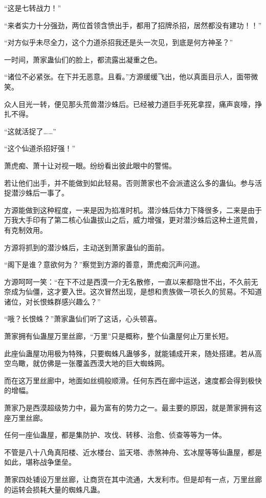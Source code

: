 \begin{this_body}
“这是七转战力！”

“来者实力十分强劲，两位首领含愤出手，都用了招牌杀招，居然都没有建功！！”

“对方似乎未尽全力，这个力道杀招我还是头一次见，到底是何方神圣？”

一时间，萧家蛊仙们的脸上，都流露出凝重之色。

“诸位不必紧张。在下并无恶意。且看。”方源缓缓飞出，他以真面目示人，面带微笑。

众人目光一转，便见那头荒兽潜沙蛛后。已经被力道巨手死死拿捏，痛声哀嚎，挣扎不得。

“这就活捉了……”

“这个仙道杀招好强！”

萧虎痴、萧十让对视一眼。纷纷看出彼此眼中的警惕。

若让他们出手，并不能做到如此轻易。否则萧家也不会派遣这么多的蛊仙。参与活捉潜沙蛛后一事了。

方源能做到这种程度，一来是因为掐准时机。潜沙蛛后体力下降很多，二来是由于万我大手印有了第二核心仙蛊拔山之后，威力增强，更对潜沙蛛后这种土道荒兽，有克制效用。

方源将抓到的潜沙蛛后，主动送到萧家蛊仙的面前。

“阁下是谁？意欲何为？”察觉到方源的善意，萧虎痴沉声问道。

方源呵呵一笑：“在下不过是西漠一介无名散修，一直以来都隐世不出，不久前无奈成为仙僵，这才要入世。这次冒然出现，是想和贵族做一项长久的贸易。不知道诸位，对长恨蛛群感兴趣么？”

“哦？长恨蛛？”萧家蛊仙们听了这话，心头顿喜。

萧家拥有仙蛊屋万里丝廊，“万里”只是概称，整个仙蛊屋何止万里长短。

此座仙蛊屋功用极为特殊，只要蜘蛛凡蛊够多，就能铺成开来，随处搭建。若从高空鸟瞰，就仿佛是一张覆盖西漠大地的巨大蜘蛛网。

而在这万里丝廊中，地面如丝绸般顺滑。任何东西在廊中运送，速度都会得到极快的增幅。

萧家乃是西漠超级势力中，最为富有的势力之一。最主要的原因，就是萧家拥有这座万里丝廊。

任何一座仙蛊屋，都是集防护、攻伐、转移、治愈、侦查等等为一体。

不管是八十八角真阳楼、近水楼台、监天塔、赤煞神舟、玄冰屋等等仙蛊屋，都是如此，堪称战争堡垒。

萧家四处铺设万里丝廊，让商货在其中流通，大发利市。但是却有一点，万里丝廊的运转会损耗大量的蜘蛛凡蛊。


\end{this_body}
